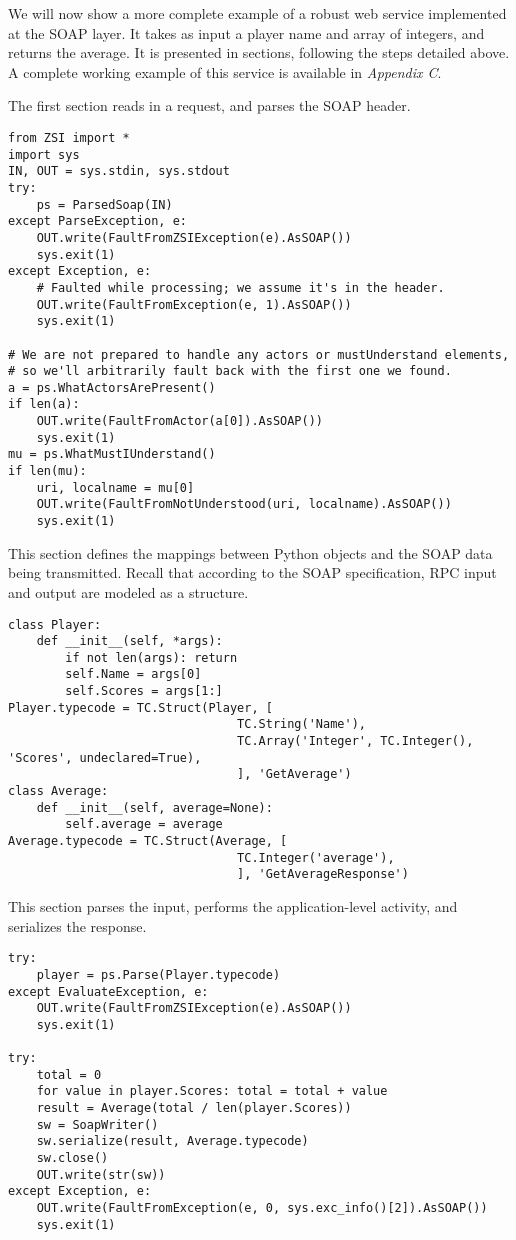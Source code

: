 We will now show a more complete example of a robust web service implemented at
the SOAP layer. It takes as input a player name and array of integers, and returns
the average.  It is presented in sections, following the steps detailed above.
A complete working example of this service is available in \emph{Appendix C}.

The first section reads in a request, and parses the SOAP header.

\begin{verbatim}
from ZSI import *
import sys
IN, OUT = sys.stdin, sys.stdout
try:
    ps = ParsedSoap(IN)
except ParseException, e:
    OUT.write(FaultFromZSIException(e).AsSOAP())
    sys.exit(1)
except Exception, e:
    # Faulted while processing; we assume it's in the header.
    OUT.write(FaultFromException(e, 1).AsSOAP())
    sys.exit(1)

# We are not prepared to handle any actors or mustUnderstand elements,
# so we'll arbitrarily fault back with the first one we found.
a = ps.WhatActorsArePresent()
if len(a):
    OUT.write(FaultFromActor(a[0]).AsSOAP())
    sys.exit(1)
mu = ps.WhatMustIUnderstand()
if len(mu):
    uri, localname = mu[0]
    OUT.write(FaultFromNotUnderstood(uri, localname).AsSOAP())
    sys.exit(1)
\end{verbatim}

This section defines the mappings between Python objects and the SOAP
data being transmitted.  Recall that according to the SOAP specification, RPC
input and output are modeled as a structure.

\begin{verbatim}
class Player:
    def __init__(self, *args):
        if not len(args): return
        self.Name = args[0]
        self.Scores = args[1:]
Player.typecode = TC.Struct(Player, [
                                TC.String('Name'),
                                TC.Array('Integer', TC.Integer(), 'Scores', undeclared=True),
                                ], 'GetAverage')
class Average:
    def __init__(self, average=None):
        self.average = average
Average.typecode = TC.Struct(Average, [
                                TC.Integer('average'),
                                ], 'GetAverageResponse')
\end{verbatim}

This section parses the input, performs the application-level
activity, and serializes the response.
\begin{verbatim}
try:
    player = ps.Parse(Player.typecode)
except EvaluateException, e:
    OUT.write(FaultFromZSIException(e).AsSOAP())
    sys.exit(1)

try:
    total = 0
    for value in player.Scores: total = total + value
    result = Average(total / len(player.Scores))
    sw = SoapWriter()
    sw.serialize(result, Average.typecode)
    sw.close()
    OUT.write(str(sw))
except Exception, e:
    OUT.write(FaultFromException(e, 0, sys.exc_info()[2]).AsSOAP())
    sys.exit(1)
\end{verbatim}

